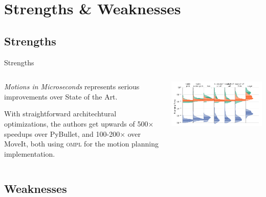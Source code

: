 \documentclass{beamer}
\begin{document}
\section{Strengths \& Weaknesses}

\subsection{Strengths}

\begin{frame}{Strengths}
\begin{columns}
\begin{column}{0.5\textwidth}
\textit{Motions in Microseconds} represents serious improvements over State of the Art.
\vspace{10px}

With straightforward architechtural optimizations, the authors get upwards of 500$\times$ speedups over PyBullet, and 100-200$\times$ over MoveIt, both using \textsc{ompl} for the motion planning implementation.
\end{column}
\begin{column}{0.5\textwidth}
\includegraphics[width=\textwidth]{./assets/panda_graphs.png}
\end{column}
\end{columns}

\end{frame}

\subsection{Weaknesses}
\end{document}
